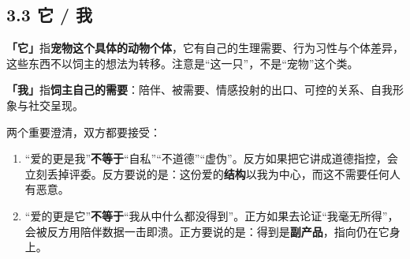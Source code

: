 \documentclass[prep,both]{debate}
\begin{document}
\subsection{3.3 它 / 我}
\begin{bullets}
\item \textbf{「它」}指\textbf{宠物这个具体的动物个体}，它有自己的生理需要、行为习性与个体差异，这些东西不以饲主的想法为转移。注意是“这一只”，不是“宠物”这个类。
\item \textbf{「我」}指\textbf{饲主自己的需要}：陪伴、被需要、情感投射的出口、可控的关系、自我形象与社交呈现。
\item 两个重要澄清，双方都要接受：
\begin{enumerate}[leftmargin=1.8em,itemsep=2pt,topsep=2pt]
\item “爱的更是我”\textbf{不等于}“自私”“不道德”“虚伪”。反方如果把它讲成道德指控，会立刻丢掉评委。反方要说的是：这份爱的\textbf{结构}以我为中心，而这不需要任何人有恶意。
\item “爱的更是它”\textbf{不等于}“我从中什么都没得到”。正方如果去论证“我毫无所得”，会被反方用陪伴数据一击即溃。正方要说的是：得到是\textbf{副产品}，指向仍在它身上。
\end{enumerate}
\end{bullets}
\end{document}
